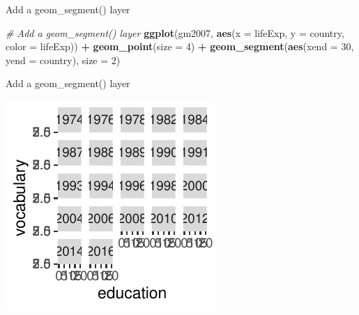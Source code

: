\documentclass[
  ignorenonframetext,
]{beamer}
\newenvironment{Shaded}{\begin{snugshade}}{\end{snugshade}}
\newcommand{\AttributeTok}[1]{\textcolor[rgb]{0.13,0.29,0.53}{#1}}
\newcommand{\CommentTok}[1]{\textcolor[rgb]{0.56,0.35,0.01}{\textit{#1}}}
\newcommand{\DecValTok}[1]{\textcolor[rgb]{0.00,0.00,0.81}{#1}}
\newcommand{\FunctionTok}[1]{\textcolor[rgb]{0.13,0.29,0.53}{\textbf{#1}}}
\newcommand{\NormalTok}[1]{#1}
\newcommand{\SpecialCharTok}[1]{\textcolor[rgb]{0.81,0.36,0.00}{\textbf{#1}}}
\begin{document}
\begin{frame}[fragile]{Add a geom\_segment() layer}
\label{add-a-geom_segment-layer}

\begin{Shaded}
\begin{Highlighting}[]
\CommentTok{\# Add a geom\_segment() layer}
\FunctionTok{ggplot}\NormalTok{(gm2007, }\FunctionTok{aes}\NormalTok{(}\AttributeTok{x =}\NormalTok{ lifeExp, }\AttributeTok{y =}\NormalTok{ country, }\AttributeTok{color =}\NormalTok{ lifeExp)) }\SpecialCharTok{+}
    \FunctionTok{geom\_point}\NormalTok{(}\AttributeTok{size =} \DecValTok{4}\NormalTok{) }\SpecialCharTok{+} \FunctionTok{geom\_segment}\NormalTok{(}\FunctionTok{aes}\NormalTok{(}\AttributeTok{xend =} \DecValTok{30}\NormalTok{, }\AttributeTok{yend =}\NormalTok{ country),}
    \AttributeTok{size =} \DecValTok{2}\NormalTok{)}
\end{Highlighting}
\end{Shaded}
\end{frame}

\begin{frame}{Add a geom\_segment() layer}
\label{add-a-geom_segment-layer-1}

\begin{center}\includegraphics[width=0.5\linewidth]{Figs/unnamed-chunk-94-1} \end{center}
\end{frame}
\end{document}
